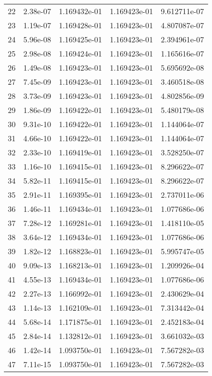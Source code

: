 \documentclass[a4paper,12pt]{article}
\begin{document}
\begin{center}
\begin{tabular}{c c c c c}
22 & 2.38e-07 & 1.169432e-01 & 1.169423e-01 & 9.612711e-07 \\
23 & 1.19e-07 & 1.169428e-01 & 1.169423e-01 & 4.807087e-07 \\
24 & 5.96e-08 & 1.169425e-01 & 1.169423e-01 & 2.394961e-07 \\
25 & 2.98e-08 & 1.169424e-01 & 1.169423e-01 & 1.165616e-07 \\
26 & 1.49e-08 & 1.169423e-01 & 1.169423e-01 & 5.695692e-08 \\
27 & 7.45e-09 & 1.169423e-01 & 1.169423e-01 & 3.460518e-08 \\
28 & 3.73e-09 & 1.169423e-01 & 1.169423e-01 & 4.802856e-09 \\
29 & 1.86e-09 & 1.169422e-01 & 1.169423e-01 & 5.480179e-08 \\
30 & 9.31e-10 & 1.169422e-01 & 1.169423e-01 & 1.144064e-07 \\
31 & 4.66e-10 & 1.169422e-01 & 1.169423e-01 & 1.144064e-07 \\
32 & 2.33e-10 & 1.169419e-01 & 1.169423e-01 & 3.528250e-07 \\
33 & 1.16e-10 & 1.169415e-01 & 1.169423e-01 & 8.296622e-07 \\
34 & 5.82e-11 & 1.169415e-01 & 1.169423e-01 & 8.296622e-07 \\
35 & 2.91e-11 & 1.169395e-01 & 1.169423e-01 & 2.737011e-06 \\
36 & 1.46e-11 & 1.169434e-01 & 1.169423e-01 & 1.077686e-06 \\
37 & 7.28e-12 & 1.169281e-01 & 1.169423e-01 & 1.418110e-05 \\
38 & 3.64e-12 & 1.169434e-01 & 1.169423e-01 & 1.077686e-06 \\
39 & 1.82e-12 & 1.168823e-01 & 1.169423e-01 & 5.995747e-05 \\
40 & 9.09e-13 & 1.168213e-01 & 1.169423e-01 & 1.209926e-04 \\
41 & 4.55e-13 & 1.169434e-01 & 1.169423e-01 & 1.077686e-06 \\
42 & 2.27e-13 & 1.166992e-01 & 1.169423e-01 & 2.430629e-04 \\
43 & 1.14e-13 & 1.162109e-01 & 1.169423e-01 & 7.313442e-04 \\
44 & 5.68e-14 & 1.171875e-01 & 1.169423e-01 & 2.452183e-04 \\
45 & 2.84e-14 & 1.132812e-01 & 1.169423e-01 & 3.661032e-03 \\
46 & 1.42e-14 & 1.093750e-01 & 1.169423e-01 & 7.567282e-03 \\
47 & 7.11e-15 & 1.093750e-01 & 1.169423e-01 & 7.567282e-03 \\

\end{tabular}
\end{center}
\end{document}
